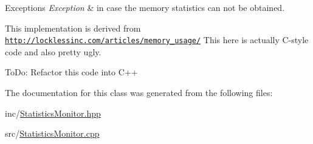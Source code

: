\begin{DoxyExceptions}{Exceptions}
{\em Exception} & in case the memory statistics can not be obtained.\\
\hline
\end{DoxyExceptions}
This implementation is derived from \href{http://locklessinc.com/articles/memory_usage/}{\tt http\+://locklessinc.\+com/articles/memory\+\_\+usage/} This here is actually C-\/style code and also pretty ugly.

To\+Do\+: Refactor this code into C++ 

The documentation for this class was generated from the following files\+:\begin{DoxyCompactItemize}
\item 
inc/\hyperlink{_statistics_monitor_8hpp}{Statistics\+Monitor.\+hpp}\item 
src/\hyperlink{_statistics_monitor_8cpp}{Statistics\+Monitor.\+cpp}\end{DoxyCompactItemize}
